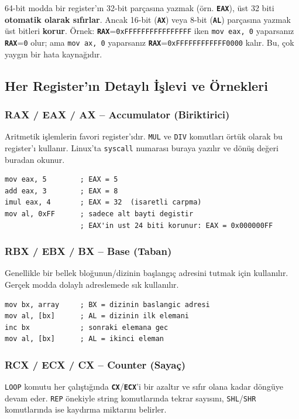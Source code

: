 \documentclass[11pt,a4paper]{article}
\newcommand{\reg}[1]{\texttt{\color{anaMavi}\textbf{#1}}}
\newcommand{\hx}[1]{\texttt{\color{turuncu}#1}}
\newcommand{\kod}[1]{\texttt{\color{koyuGri}#1}}
\begin{document}
\begin{uyarikutu}
64-bit modda bir register'ın 32-bit parçasına yazmak (örn. \reg{EAX}), üst 32
biti \textbf{otomatik olarak sıfırlar}. Ancak 16-bit (\reg{AX}) veya 8-bit
(\reg{AL}) parçasına yazmak üst bitleri \textbf{korur}. Örnek: \reg{RAX}=\hx{0xFFFFFFFFFFFFFFFF}
iken \kod{mov eax, 0} yaparsanız \reg{RAX}=\hx{0} olur; ama \kod{mov ax, 0}
yaparsanız \reg{RAX}=\hx{0xFFFFFFFFFFFF0000} kalır. Bu, çok yaygın bir hata
kaynağıdır.
\end{uyarikutu}

\subsection{Her Register'ın Detaylı İşlevi ve Örnekleri}

\subsubsection{RAX / EAX / AX -- Accumulator (Biriktirici)}
Aritmetik işlemlerin favori register'ıdır. \kod{MUL} ve \kod{DIV} komutları
örtük olarak bu register'ı kullanır. Linux'ta \kod{syscall} numarası buraya
yazılır ve dönüş değeri buradan okunur.

\begin{lstlisting}
mov eax, 5        ; EAX = 5
add eax, 3        ; EAX = 8
imul eax, 4       ; EAX = 32  (isaretli carpma)
mov al, 0xFF      ; sadece alt bayti degistir
                  ; EAX'in ust 24 biti korunur: EAX = 0x000000FF
\end{lstlisting}

\subsubsection{RBX / EBX / BX -- Base (Taban)}
Genellikle bir bellek bloğunun/dizinin başlangıç adresini tutmak için kullanılır.
Gerçek modda dolaylı adreslemede sık kullanılır.

\begin{lstlisting}
mov bx, array     ; BX = dizinin baslangic adresi
mov al, [bx]      ; AL = dizinin ilk elemani
inc bx            ; sonraki elemana gec
mov al, [bx]      ; AL = ikinci eleman
\end{lstlisting}

\subsubsection{RCX / ECX / CX -- Counter (Sayaç)}
\kod{LOOP} komutu her çalıştığında \reg{CX}/\reg{ECX}'i bir azaltır ve sıfır
olana kadar döngüye devam eder. \kod{REP} önekiyle string komutlarında tekrar
sayısını, \kod{SHL}/\kod{SHR} komutlarında ise kaydırma miktarını belirler.
\end{document}
